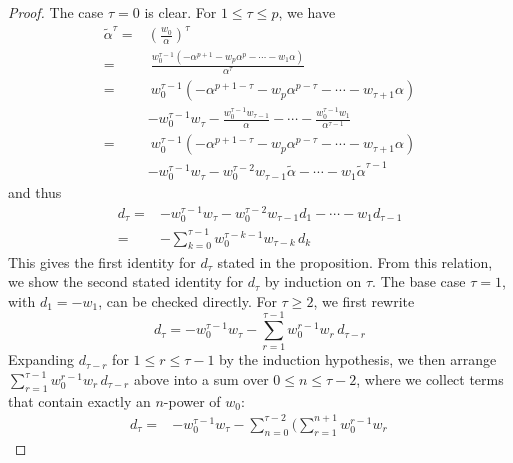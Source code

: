 \documentclass{gtpart}
\theoremstyle{definition}
\theoremstyle{remark}
\newcommand{\A}{\alpha}
\newcommand{\T}{\tau}
\renewcommand{\=}{\approx}
\renewcommand{\-}{\sim}
\numberwithin{equation}{section}
\numberwithin{thm}{section}
\begin{document}
\begin{proof}
 The case $\T = 0$ is clear.  For $1 \leq \T \leq p$, we have 
 \begin{equation*}
  \begin{split}
   \widetilde{\A}^\T = & \left( \frac{w_0}{\A} \right)^{\!\T} \\
                     = & ~ \frac{w_0^{\T - 1} (-\A^{p + 1} - w_p \A^p - \cdots 
                         - w_1 \A)}{\A^\T} \\
                     = & ~ w_0^{\T - 1} (-\A^{p + 1 - \T} - w_p \A^{p - \T} 
                         - \cdots - w_{\T + 1} \A) \\
                       & - w_0^{\T - 1} w_\T 
                         - \frac{w_0^{\T - 1} w_{\T - 1}}{\A} - \cdots 
                         - \frac{w_0^{\T - 1} w_1}{\A^{\T - 1}} \\
                     = & ~ w_0^{\T - 1} (-\A^{p + 1 - \T} - w_p \A^{p - \T} 
                         - \cdots - w_{\T + 1} \A) \\
                       & - w_0^{\T - 1} w_\T 
                         - w_0^{\T - 2} w_{\T - 1} \widetilde{\A} - \cdots 
                         - w_1 \widetilde{\A}^{\T - 1} 
  \end{split}
 \end{equation*}
 and thus 
 \begin{equation*}
  \begin{split}
   d_\T = & -w_0^{\T - 1} w_\T - w_0^{\T - 2} w_{\T - 1} d_1 - \cdots 
            - w_1 d_{\T - 1} \\
        = & -\sum_{k = 0}^{\T - 1} w_0^{\T - k - 1} w_{\T - k} \, d_k 
  \end{split}
 \end{equation*}
 This gives the first identity for $d_\T$ stated in the proposition.  From this 
 relation, we show the second stated identity for $d_\T$ by induction on $\T$.  
 The base case $\T = 1$, with $d_1 = -w_1$, can be checked directly.  For 
 $\T \geq 2$, we first rewrite 
 \[
  d_\T = -w_0^{\T - 1} w_\T - \sum_{r = 1}^{\T - 1} 
  w_0^{r - 1} w_r \, d_{\T - r} 
 \]
 Expanding $d_{\T - r}$ for $1 \leq r \leq \T - 1$ by the induction hypothesis, 
 we then arrange $\sum_{r = 1}^{\T - 1} w_0^{r - 1} w_r \, d_{\T - r}$ above 
 into a sum over $0 \leq n \leq \T - 2$, where we collect terms that contain 
 exactly an $n$-power of $w_0$: 
 \begin{equation*}
  \begin{split}
   d_\T = & -w_0^{\T - 1} w_\T - \sum_{n = 0}^{\T - 2} 
            \Bigg( \sum_{r = 1}^{n + 1} w_0^{r - 1} w_r \, 

\end{split}
\end{equation*}
\end{proof}
\end{document}
